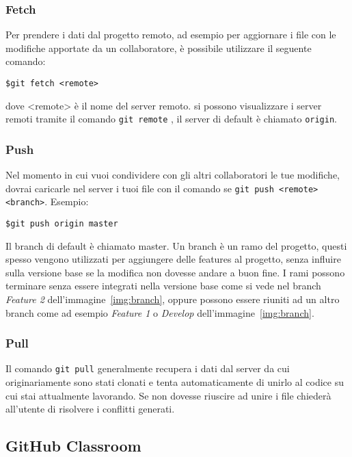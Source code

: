 			\subsubsection*{Fetch}
				Per prendere i dati dal progetto remoto, ad esempio per aggiornare i file con le modifiche apportate da un collaboratore, è possibile utilizzare il seguente comando:
				\begin{tcolorbox}
					\texttt{\$\qquad git fetch <remote>}
				\end{tcolorbox}
				dove <remote> è il nome del server remoto. si possono visualizzare i server remoti tramite il comando \verb|git remote| , il server di default è chiamato \verb|origin|.
			
			
			\subsubsection*{Push}
				Nel momento in cui vuoi condividere con gli altri collaboratori le tue modifiche, dovrai caricarle nel server i tuoi file con il comando se \verb|git push <remote> <branch>|. Esempio:
				\begin{tcolorbox}
					\texttt{\$\qquad git push origin master}
				\end{tcolorbox}
				Il branch di default è chiamato master. Un branch è un ramo del progetto, questi spesso vengono utilizzati per aggiungere delle features al progetto, senza influire sulla versione base se la modifica non dovesse andare a buon fine. I rami possono terminare senza essere integrati nella versione base come si vede nel branch \textit{Feature 2} dell'immagine~\ref{img:branch}, oppure possono essere riuniti ad un altro branch come ad esempio \textit{Feature 1} o \textit{Develop} dell'immagine~\ref{img:branch}.
				
				\begin{center}
					\label{img:branch}
				\end{center}
			
			\subsubsection*{Pull}
				Il comando \verb|git pull| generalmente recupera i dati dal server da cui originariamente sono stati clonati e tenta automaticamente di unirlo al codice su cui stai attualmente lavorando. Se non dovesse riuscire ad unire i file chiederà all'utente di risolvere i conflitti generati.

		\subsection{GitHub Classroom}\label{def:Classroom}
	
	

	
